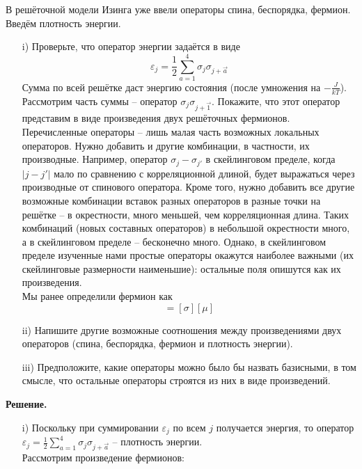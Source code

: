 \documentclass[12pt]{article}
\theoremstyle{definition}
\begin{document}
\begin{enumerate}
В решёточной модели Изинга уже ввели операторы спина, беспорядка, фермион. Введём плотность энергии.
\begin{itemize}
    \item[i)] Проверьте, что оператор энергии задаётся в виде
    \begin{equation}
        \varepsilon_j=\frac{1}{2}\sum\limits_{a=1}^4\sigma_j\sigma_{j+\vec{a}}
    \end{equation}
    Сумма по всей решётке даст энергию состояния (после умножения на $-\frac{J}{kT}$). Рассмотрим часть суммы -- оператор $\sigma_j\sigma_{j+\vec{1}}$. Покажите, что этот оператор представим в виде произведения двух решёточных фермионов.\\
    Перечисленные операторы -- лишь малая часть возможных локальных операторов. Нужно добавить и другие комбинации, в частности, их производные. Например, оператор $\sigma_j-\sigma_{j'}$ в скейлинговом пределе, когда $|j-j'|$ мало по сравнению с корреляционной длиной, будет выражаться через производные от спинового оператора. Кроме того, нужно добавить все другие возможные комбинации вставок разных операторов в разные точки на решётке -- в окрестности, много меньшей, чем корреляционная длина. Таких комбинаций (новых составных операторов) в небольшой окрестности много, а в скейлинговом пределе -- бесконечно много. Однако, в скейлинговом пределе изученные нами простые операторы окажутся наиболее важными (их скейлинговые размерности наименьшие): остальные поля опишутся как их произведения.\\
    Мы ранее определили фермион как
    \begin{equation}
        [\Psi]=[\sigma][\mu]
    \end{equation}
    \item[ii)] Напишите другие возможные соотношения между произведениями двух операторов (спина, беспорядка, фермион и плотность энергии).
    \item[iii)] Предположите, какие операторы можно было бы назвать базисными, в том смысле, что остальные операторы строятся из них в виде произведений.
\end{itemize}
\textbf{Решение.}
\begin{itemize}
    \item[i)] Поскольку при суммировании $\varepsilon_j$ по всем $j$ получается энергия, то оператор $\varepsilon_j=\frac{1}{2}\sum\limits_{a=1}^4\sigma_j\sigma_{j+\vec{a}}$ -- плотность энергии.\\
    Рассмотрим произведение фермионов:
    \begin{equation}

\end{equation}
\end{itemize}
\end{enumerate}
\end{document}
